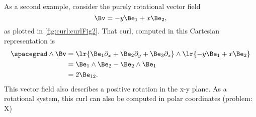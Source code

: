 As a second example, consider the purely rotational vector field
\begin{equation}\label{eqn:vectorcalc:1090}
\Bv = -y \Be_1 + x \Be_2,
\end{equation}
as plotted in \cref{fig:curl:curlFig2}.
That curl, computed in this Cartesian representation is
\begin{equation}\label{eqn:vectorcalc:1110}
\begin{aligned}
\spacegrad \wedge \Bv
&=
\lr{ \Be_1 \partial_x + \Be_2 \partial_y + \Be_3 \partial_z } \wedge \lr{ -y \Be_1 + x \Be_2 } \\
&=
\Be_1 \wedge \Be_2 - \Be_2 \wedge \Be_1 \\
&=
2 \Be_{12}.
\end{aligned}
\end{equation}
This vector field also describes a positive rotation in the x-y plane.
As a rotational system, this curl can also be computed in polar coordinates (problem: X)

